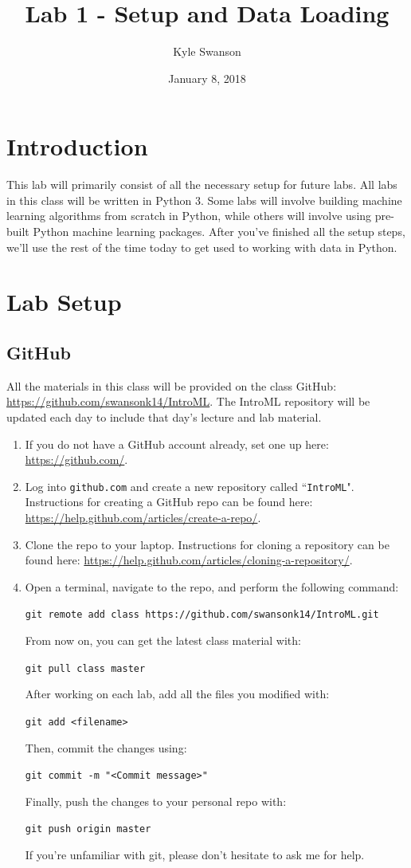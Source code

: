 \documentclass{article}
\title{Lab 1 - Setup and Data Loading}
\author{Kyle Swanson}
\date{January 8, 2018}
\begin{document}
\maketitle

\section{Introduction}

This lab will primarily consist of all the necessary setup for future labs. All labs in this class will be written in Python 3. Some labs will involve building machine learning algorithms from scratch in Python, while others will involve using pre-built Python machine learning packages. After you've finished all the setup steps, we'll use the rest of the time today to get used to working with data in Python.

\section{Lab Setup}

\subsection{GitHub}

All the materials in this class will be provided on the class GitHub: \url{https://github.com/swansonk14/IntroML}. The IntroML repository will be updated each day to include that day's lecture and lab material.

\begin{enumerate}
	\item If you do not have a GitHub account already, set one up here: \url{https://github.com/}.
	\item Log into \texttt{github.com} and create a new repository called ``\texttt{IntroML}". Instructions for creating a GitHub repo can be found here: \url{https://help.github.com/articles/create-a-repo/}.
	\item Clone the repo to your laptop. Instructions for cloning a repository can be found here: \url{https://help.github.com/articles/cloning-a-repository/}.
	\item Open a terminal, navigate to the repo, and perform the following command:

	\texttt{git remote add class https://github.com/swansonk14/IntroML.git}

	From now on, you can get the latest class material with:

	\texttt{git pull class master}

	After working on each lab, add all the files you modified with:

	\texttt{git add <filename>}

	Then, commit the changes using:

	\texttt{git commit -m "<Commit message>"}

	Finally, push the changes to your personal repo with:

	\texttt{git push origin master}

	If you're unfamiliar with git, please don't hesitate to ask me for help.
\end{enumerate}
\end{document}
